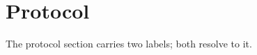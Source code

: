 \section{Protocol}
\label{sec:protocol}
\label{sec:alias}
The protocol section carries two labels; both resolve to it.
